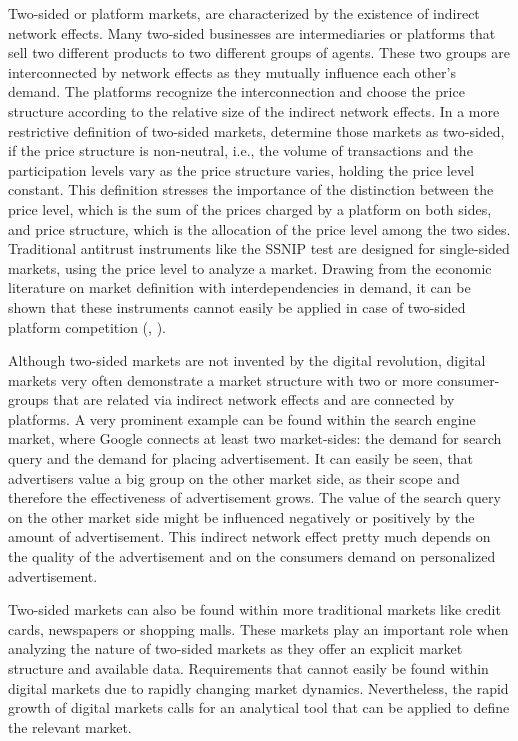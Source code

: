 \documentclass[12pt,a4paper,notitlepage]{article}
\begin{document}
Two-sided or platform markets, are characterized by the existence of indirect network effects. Many two-sided businesses are intermediaries or platforms that sell two different products to two different groups of agents. These two groups are interconnected by network effects as they mutually influence each other’s demand. The platforms recognize the interconnection and choose the price structure according to the relative size of the indirect network effects. In a more restrictive definition of two-sided markets, \citet{rochet_platform_2003} determine those markets as two-sided, if the price structure is non-neutral, i.e., the volume of transactions and the participation levels vary as the price structure varies, holding the price level constant. This definition stresses the importance of the distinction between the price level, which is the sum of the prices charged by a platform on both sides, and price structure, which is the allocation of the price level among the two sides. Traditional antitrust instruments like the SSNIP test are designed for single-sided markets, using the price level to analyze a market. Drawing from the economic literature on market definition with interdependencies in demand, it can be shown that these instruments cannot easily be applied in case of two-sided platform competition (\citet{noel_analyzing_2005}, \citet{filistrucchi_market_2013}).

Although two-sided markets are not invented by the digital revolution, digital markets very often demonstrate a market structure with two or more consumer-groups that are related via indirect network effects and are connected by platforms. A very prominent example can be found within the search engine market, where Google connects at least two market-sides: the demand for search query and the demand for placing advertisement. It can easily be seen, that advertisers value a big group on the other market side, as their scope and therefore the effectiveness of advertisement grows. The value of the search query on the other market side might be influenced negatively or positively by the amount of advertisement. This indirect network effect pretty much depends on the quality of the advertisement and on the consumers demand on personalized advertisement.

Two-sided markets can also be found within more traditional markets like credit cards, newspapers or shopping malls. These markets play an important role when analyzing the nature of two-sided markets as they offer an explicit market structure and available data. Requirements that cannot easily be found within digital markets due to rapidly changing market dynamics. Nevertheless, the rapid growth of digital markets calls for an analytical tool that can be applied to define the relevant market.
\end{document}
